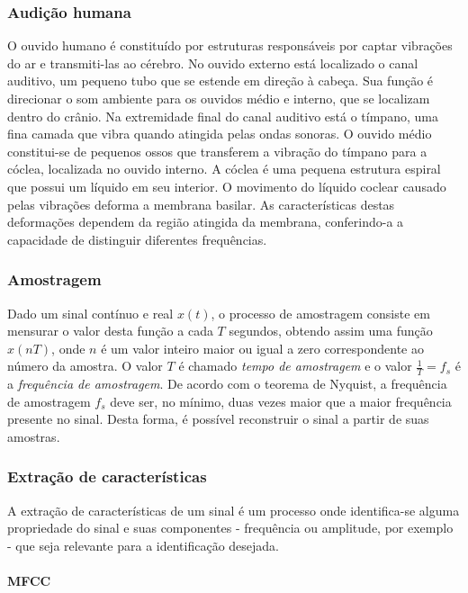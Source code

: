 \documentclass[a4paper, 12pt]{article}
\begin{document}
		\subsubsection{Audição humana}
		O ouvido humano é constituído por estruturas responsáveis por captar vibrações do ar e transmiti-las ao cérebro. 
		No ouvido externo está localizado o canal auditivo, um pequeno tubo que se estende em direção à cabeça. Sua função é direcionar o som ambiente para os ouvidos médio e interno, que se localizam dentro do crânio. Na extremidade final do canal auditivo está o tímpano, uma fina camada que vibra quando atingida pelas ondas sonoras.
		O ouvido médio constitui-se de pequenos ossos que transferem a vibração do tímpano para a cóclea, localizada no ouvido interno.\cite{smith1999dsp} 
		A cóclea é uma pequena estrutura espiral que possui um líquido em seu interior. O movimento do líquido coclear causado pelas vibrações deforma a membrana basilar. As características destas deformações dependem da região atingida da membrana, conferindo-a a capacidade de distinguir diferentes frequências.\cite{purves2001neuroscience}
		
		\subsubsection{Amostragem}
		 Dado um sinal contínuo e real $x(t) $, o processo de amostragem consiste em mensurar o valor desta função a cada $ T $ segundos, obtendo assim uma função $ x(nT) $, onde $ n $ é um valor inteiro maior ou igual a zero correspondente ao número da amostra. O valor $ T $ é chamado \textit{tempo de amostragem} e o valor $ \frac{1}{T} = f_s $ é a \textit{frequência de amostragem}.
		 De acordo com o teorema de Nyquist, a frequência de amostragem $ f_s $ deve ser, no mínimo, duas vezes maior que a maior frequência presente no sinal. Desta forma, é possível reconstruir o sinal a partir de suas amostras.
		 
		\subsubsection{Extração de características}
		A extração de características de um sinal é um processo onde identifica-se alguma propriedade do sinal e suas componentes - frequência ou amplitude, por exemplo - que seja relevante para a identificação desejada. 
		\paragraph{MFCC}
		
\end{document}
